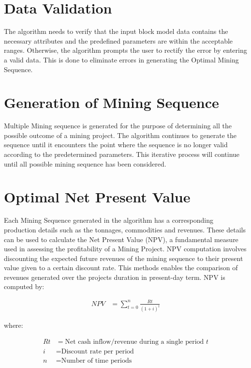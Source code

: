 \documentclass[12pt]{report}
\begin{document}
\section{Data Validation}

The algorithm needs to verify that the input block model data contains the necessary attributes and the predefined parameters are within the acceptable ranges.
Otherwise, the algorithm prompts the user to rectify the error by entering a valid data.
This is done to eliminate errors in generating the Optimal Mining Sequence.

\section{Generation of Mining Sequence}

Multiple Mining sequence is generated for the purpose of determining all the possible outcome of a mining project.
The algorithm continues to generate the sequence until it encounters the point where the sequence is no longer valid according to the predetermined parameters.
This iterative process will continue until all possible mining sequence has been considered.

\section{Optimal Net Present Value}

Each Mining Sequence generated in the algorithm has a corresponding production details such as the tonnages, commodities and revenues.
These details can be used to calculate the Net Present Value (NPV), a fundamental measure used in assessing the profitability of a Mining Project.
NPV computation involves discounting the expected future revenues of the mining sequence to their present value given to a certain discount rate.
This methods enables the comparison of revenues generated over the projects duration in present-day term.
NPV is computed by:

\begin{align}
    NPV &= \sum_{t=0}^{n}\frac{Rt}{(1 + i)^{t}}
\end{align}

where:

\begin{align}
    Rt & = \text{Net cash inflow/revenue during a single period } t \\
    i  & = \text{Discount rate per period}                          \\
    n  & = \text{Number of time periods}
\end{align}
\end{document}
